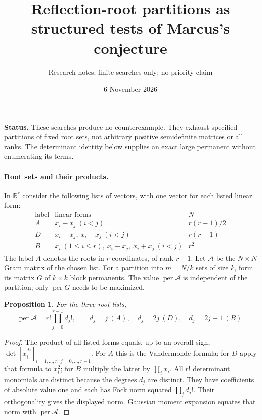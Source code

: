 \documentclass[11pt]{article}
\title{Reflection-root partitions as structured tests of Marcus's conjecture}
\author{Research notes; finite searches only; no priority claim}
\date{6 November 2026}
\newtheorem{proposition}{Proposition}
\newcommand{\per}{\operatorname{per}}
\begin{document}
\maketitle
\noindent\textbf{Status.} These searches produce no counterexample.
They exhaust specified partitions of fixed root sets, not arbitrary
positive semidefinite matrices or all ranks. The determinant identity
below supplies an exact large permanent without enumerating its terms.

\paragraph{Root sets and their products.}
In $\mathbb R^r$ consider the following lists of vectors, with one vector
for each listed linear form:
\[
 \begin{array}{c|c|c}
 \text{label}&\text{linear forms}&N\\\hline
 A&x_i-x_j\ (i<j)&r(r-1)/2\\
 D&x_i-x_j,\ x_i+x_j\ (i<j)&r(r-1)\\
 B&x_i\ (1\le i\le r),\ x_i-x_j,\ x_i+x_j\ (i<j)&r^2
 \end{array}
\]
The label $A$ denotes the roots in $r$ coordinates, of rank $r-1$.
Let $\mathcal A$ be the $N\times N$ Gram matrix of the chosen list.
For a partition into $m=N/k$ sets of size $k$, form its matrix $G$ of
$k\times k$ block permanents. The value $\per\mathcal A$ is independent
of the partition; only $\per G$ needs to be maximized.

\begin{proposition}
For the three root lists,
\[
 \per\mathcal A=r!\prod_{j=0}^{r-1}d_j!,\qquad
 d_j=j\ (A),\quad d_j=2j\ (D),\quad d_j=2j+1\ (B).
\]
\end{proposition}
\begin{proof}
The product of all listed forms equals, up to an overall sign,
$\det[x_i^{d_j}]_{i=1,\ldots,r;\ j=0,\ldots,r-1}$.
For $A$ this is the Vandermonde formula; for $D$ apply that formula to
$x_i^2$; for $B$ multiply the latter by $\prod_i x_i$.
All $r!$ determinant monomials are distinct because the degrees $d_j$
are distinct. They have coefficients of absolute value one and each has
Fock norm squared $\prod_jd_j!$. Their orthogonality gives the displayed
norm. Gaussian moment expansion equates that norm with $\per\mathcal A$.
\end{proof}
\end{document}
